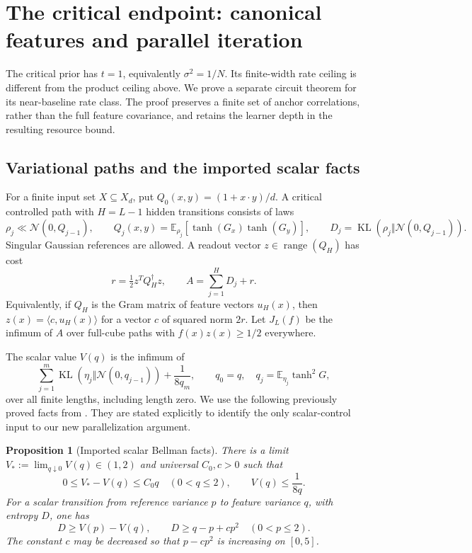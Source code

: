 \documentclass[11pt]{article}
\newtheorem{proposition}[theorem]{Proposition}
\theoremstyle{remark}
\newcommand{\E}{\mathbb E}
\newcommand{\KL}{\operatorname{KL}}
\begin{document}
\section{The critical endpoint: canonical features and parallel iteration}
\label{sec:critical-parallel}

The critical prior has $t=1$, equivalently $\sigma^2=1/N$. Its
finite-width rate ceiling is different from the product ceiling above.
We prove a separate circuit theorem for its near-baseline rate class.
The proof preserves a finite set of anchor correlations, rather than
the full feature covariance, and retains the learner depth in the
resulting resource bound.

\subsection{Variational paths and the imported scalar facts}

For a finite input set $X\subseteq X_d$, put
$Q_0(x,y)=(1+x\cdot y)/d$. A critical controlled path with
$H=L-1$ hidden transitions consists of laws
\[
 \rho_j\ll\mathcal N(0,Q_{j-1}),\qquad
 Q_j(x,y)=\E_{\rho_j}[\tanh(G_x)\tanh(G_y)],
 \qquad D_j=\KL(\rho_j\Vert\mathcal N(0,Q_{j-1})).
\]
Singular Gaussian references are allowed. A readout vector
$z\in\operatorname{range}(Q_H)$ has cost
\[
 r=\tfrac12z^TQ_H^\dagger z,
 \qquad A=\sum_{j=1}^H D_j+r.
\]
Equivalently, if $Q_H$ is the Gram matrix of feature vectors $u_H(x)$,
then $z(x)=\langle c,u_H(x)\rangle$ for a vector $c$ of squared norm
$2r$. Let $J_L(f)$ be the infimum of $A$ over full-cube paths with
$f(x)z(x)\ge1/2$ everywhere.

The scalar value $V(q)$ is the infimum of
\[
 \sum_{j=1}^m\KL(\eta_j\Vert\mathcal N(0,q_{j-1}))
       +\frac1{8q_m},\qquad
 q_0=q,\quad q_j=\E_{\eta_j}\tanh^2 G,
\]
over all finite lengths, including length zero. We use the following
previously proved facts from \cite[``Scalar control and target-component
constructions'']{critical}. They are stated explicitly to identify the
only scalar-control input to our new parallelization argument.

\begin{proposition}[Imported scalar Bellman facts]
\label{prop:scalar-facts}
There is a limit $V_*:=\lim_{q\downarrow0}V(q)\in(1,2)$ and universal
$C_0,c>0$ such that
\[
 0\le V_*-V(q)\le C_0q\quad(0<q\le2),\qquad
 V(q)\le\frac1{8q}.
\]
For a scalar transition from reference variance $p$ to feature variance
$q$, with entropy $D$, one has
\[
 D\ge V(p)-V(q),\qquad
 D\ge q-p+cp^2\quad(0<p\le2).
\]
The constant $c$ may be decreased so that $p-cp^2$ is increasing on
$[0,5]$.
\end{proposition}
\end{document}
